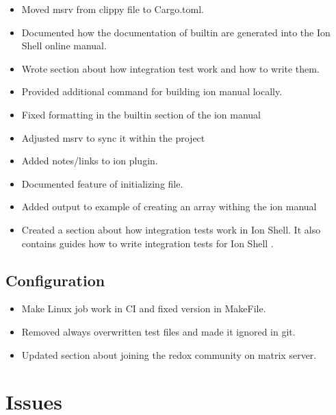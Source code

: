 \begin{itemize}
	\item Moved msrv from clippy file to Cargo.toml. \cite{pr_moved_msrv_to_cargo}
	\item Documented how the documentation of builtin are generated into the Ion Shell online manual. \cite{pr_docs_how_builtin_generated}
	\item Wrote section about how integration test work and how to write them. \cite{pr_docs_section_integraion_test}
	\item Provided additional command for building ion manual locally. \cite{pr_docs_commands_building_ion_manual}
	\item Fixed formatting in the builtin section of the ion manual \cite{pr_docs_fix_wrong_builtin_manual_section}
	\item Adjusted msrv to sync it within the project \cite{pr_docs_adjust_msrv_project}
	\item Added notes/links to ion plugin. \cite{pr_docs_ion_plugin}
	\item Documented feature of initializing file. \cite{pr_docs_init_file}
	\item Added output to example of creating an array withing the ion manual \cite{pr_docs_output_create_array}
	\item Created a section about how integration tests work in Ion Shell. It also contains guides how to write integration tests for Ion Shell \cite{pr_docs_how_to_integration_test}.
\end{itemize}

\subsection{Configuration}

\begin{itemize}
	\item Make Linux job work in CI and fixed version in MakeFile. \cite{pr_conf_partial_ci_fix}
	\item Removed always overwritten test files and made it ignored in git. \cite{pr_conf_overwritten_files}
	\item Updated section about joining the redox community on matrix server. \cite{pr_docs_update_community_links}

\end{itemize}

\section{Issues}

